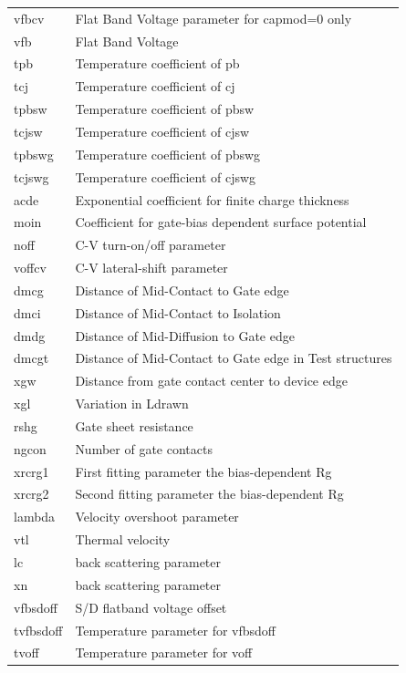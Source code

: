 \begin{longtable}{l l}
{\small vfbcv} & {\small Flat Band Voltage parameter for capmod=0 only} \\
{\small vfb} & {\small Flat Band Voltage} \\
{\small tpb} & {\small Temperature coefficient of pb} \\
{\small tcj} & {\small Temperature coefficient of cj} \\
{\small tpbsw} & {\small Temperature coefficient of pbsw} \\
{\small tcjsw} & {\small Temperature coefficient of cjsw} \\
{\small tpbswg} & {\small Temperature coefficient of pbswg} \\
{\small tcjswg} & {\small Temperature coefficient of cjswg} \\
{\small acde} & {\small Exponential coefficient for finite charge thickness} \\
{\small moin} & {\small Coefficient for gate-bias dependent surface potential} \\
{\small noff} & {\small C-V turn-on/off parameter} \\
{\small voffcv} & {\small C-V lateral-shift parameter} \\
{\small dmcg} & {\small Distance of Mid-Contact to Gate edge} \\
{\small dmci} & {\small Distance of Mid-Contact to Isolation} \\
{\small dmdg} & {\small Distance of Mid-Diffusion to Gate edge} \\
{\small dmcgt} & {\small Distance of Mid-Contact to Gate edge in Test structures} \\
{\small xgw} & {\small Distance from gate contact center to device edge} \\
{\small xgl} & {\small Variation in Ldrawn} \\
{\small rshg} & {\small Gate sheet resistance} \\
{\small ngcon} & {\small Number of gate contacts} \\
{\small xrcrg1} & {\small First fitting parameter the bias-dependent Rg} \\
{\small xrcrg2} & {\small Second fitting parameter the bias-dependent Rg} \\
{\small lambda} & {\small Velocity overshoot parameter} \\
{\small vtl} & {\small Thermal velocity} \\
{\small lc} & {\small back scattering parameter} \\
{\small xn} & {\small back scattering parameter} \\
{\small vfbsdoff} & {\small S/D flatband voltage offset} \\
{\small tvfbsdoff} & {\small Temperature parameter for vfbsdoff} \\
{\small tvoff} & {\small Temperature parameter for voff} \\


\end{longtable}
